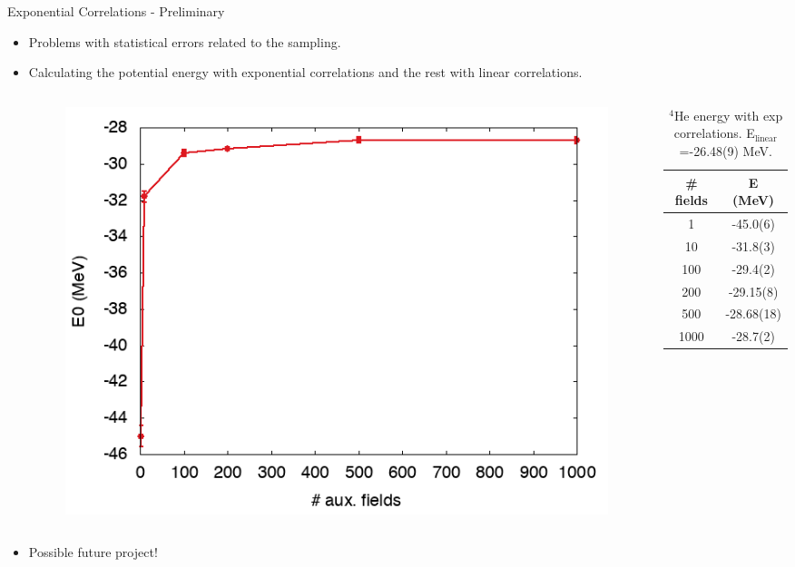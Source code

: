 \documentclass{beamer}
\begin{document}
\begin{frame}{Exponential Correlations - Preliminary}
\begin{itemize}
   \item Problems with statistical errors related to the sampling.
   \item Calculating the potential energy with exponential correlations and the rest with linear correlations.
   \vspace{-0.2cm}
   \begin{columns}
   \begin{column}{0.5\textwidth}
   \begin{figure}[h]
      \centering
      \includegraphics[width=\textwidth]{../figures/expplot.png}
   \end{figure}
   \end{column}
   \begin{column}{0.5\textwidth}
   \begin{table}[h!]
      \centering
      \caption{$^{4}$He energy with exp correlations. E$_\text{linear}$=-26.48(9) MeV.}
      \begin{tabular}{cc}
         \hline \hline
         \# fields & E (MeV) \\
         \hline
         1     & -45.0(6)  \\
         10    & -31.8(3)  \\
         100   & -29.4(2)  \\
         200   & -29.15(8) \\
         500   & -28.68(18)\\
         1000  & -28.7(2)  \\
         \hline \hline
      \end{tabular}
   \end{table}
   \end{column}
   \end{columns}
   \item Possible future project!
\end{itemize}
\end{frame}
\end{document}
